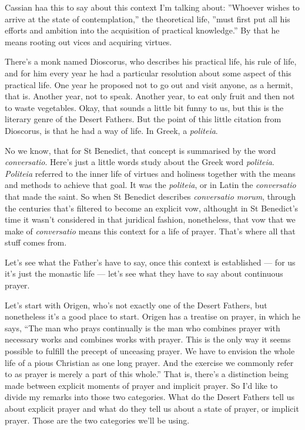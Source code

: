 Cassian haa this to say about this context I'm talking about: ''Whoever wishes to arrive at the state of contemplation,'' the theoretical life, ''must first put all his efforts and ambition into the acquisition of practical knowledge.'' By that he means rooting out vices and acquiring virtues.

There's a monk named Dioscorus, who describes his practical life, his rule of life, and for him every year he had a particular resolution about some aspect of this practical life. One year he proposed not to go out and visit anyone, as a hermit, that is. Another year, not to speak. Another year, to eat only fruit and then not to waste vegetables. Okay, that sounds a little bit funny to us, but this is the literary genre of the Desert Fathers. But the point of this little citation from Dioscorus, is that he had a way of life. In Greek, a \emph{politeia}.

No we know, that for St Benedict, that concept is summarised by the word \emph{conversatio}. Here's just a little words study about the Greek word \emph{politeia}. \emph{Politeia} referred to the inner life of virtues and holiness together with the means and methods to achieve that goal. It was the \emph{politeia}, or in Latin the \emph{conversatio} that made the saint. So when St Benedict describes \emph{conversatio morum}, through the centuries that's filtered to become an explicit vow, althought in St Benedict's time it wasn't considered in that juridical fashion, nonetheless, that vow that we make of \emph{conversatio} means this context for a life of prayer. That's where all that stuff comes from.

Let's see what the Father's have to say, once this context is established --- for us it's just the monastic life --- let's see what they have to say about continuous prayer.

Let's start with Origen, who's not exactly one of the Desert Fathers, but nonetheless it's a good place to start. Origen has a treatise on prayer, in which he says, ``The man who prays continually is the man who combines prayer with necessary works and combines works with prayer. This is the only way it seems possible to fulfill the precept of unceasing prayer. We have to envision the whole life of a pious Christian as one long prayer. And the exercise we commonly refer to as prayer is merely a part of this whole.'' That is, there's a distinction being made between explicit moments of prayer and implicit prayer. So I'd like to divide my remarks into those two categories. What do the Desert Fathers tell us about explicit prayer and what do they tell us about a state of prayer, or implicit prayer. Those are the two categories we'll be using.


